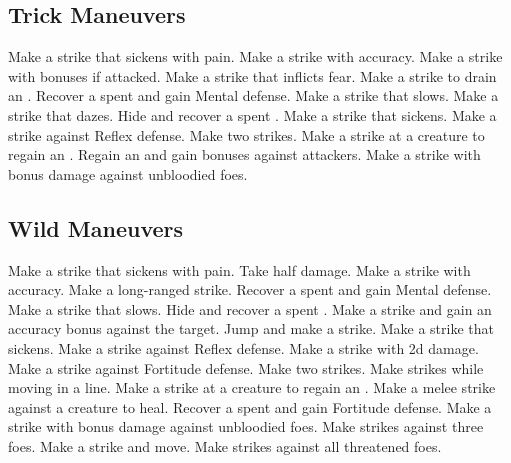 \subsection{Trick Maneuvers}\label{Trick Maneuvers}
\begin{spelllist}
 Make a strike that sickens with pain.
 Make a strike with  accuracy.
 Make a strike with bonuses if attacked.
 Make a strike that inflicts fear.
 Make a strike to drain an .
 Recover a spent  and gain  Mental defense.
 Make a strike that slows.
 Make a strike that dazes.
 Hide and recover a spent .
 Make a strike that sickens.
 Make a strike against Reflex defense.
 Make two strikes.
 Make a strike at a creature to regain an .
 Regain an  and gain bonuses against attackers.
 Make a strike with bonus damage against unbloodied foes.
\end{spelllist}



\small
\subsection{Wild Maneuvers}\label{Wild Maneuvers}
\begin{spelllist}
 Make a strike that sickens with pain.
 Take half damage.
 Make a strike with  accuracy.
 Make a long-ranged strike.
 Recover a spent  and gain  Mental defense.
 Make a strike that slows.
 Hide and recover a spent .
 Make a strike and gain an accuracy bonus against the target.
 Jump and make a strike.
 Make a strike that sickens.
 Make a strike against Reflex defense.
 Make a strike with \plus2d damage.
 Make a strike against Fortitude defense.
 Make two strikes.
 Make strikes while moving in a line.
 Make a strike at a creature to regain an .
 Make a melee strike against a creature to heal.
 Recover a spent  and gain  Fortitude defense.
 Make a strike with bonus damage against unbloodied foes.
 Make strikes against three foes.
 Make a strike and move.
 Make strikes against all threatened foes.
\end{spelllist}
